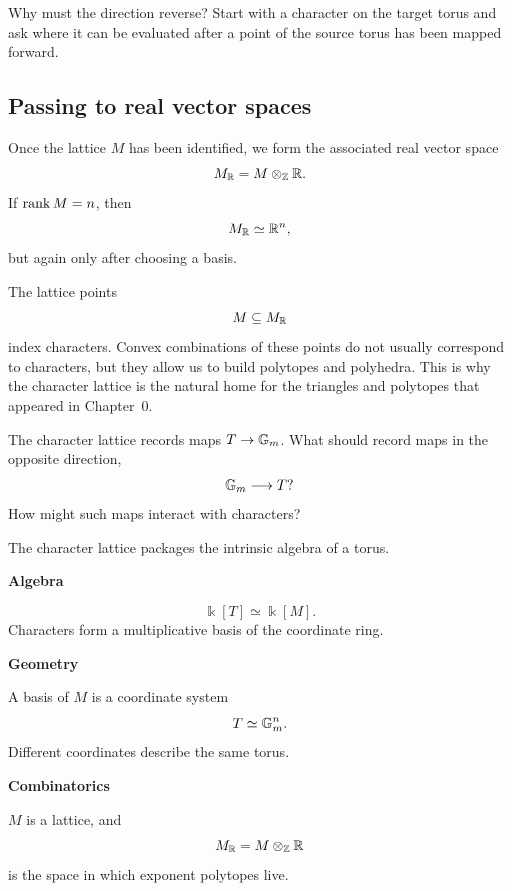 \begin{pauseandthink}
Why must the direction reverse? Start with a character on the target
torus and ask where it can be evaluated after a point of the source
torus has been mapped forward.
\end{pauseandthink}

\subsection{Passing to real vector spaces}

Once the lattice \(M\) has been identified, we form the associated
real vector space
\[
M_{\mathbb{R}}
=
M\otimes_{\mathbb{Z}}\mathbb{R}.
\]
If \(\operatorname{rank} M=n\), then
\[
M_{\mathbb{R}}\simeq\mathbb{R}^n,
\]
but again only after choosing a basis.

The lattice points
\[
M\subseteq M_{\mathbb{R}}
\]
index characters. Convex combinations of these points do not usually
correspond to characters, but they allow us to build polytopes and
polyhedra. This is why the character lattice is the natural home for
the triangles and polytopes that appeared in Chapter~0.

\begin{guidingquestion}
The character lattice records maps \(T\to\mathbb{G}_{m}\). What should record maps
in the opposite direction,
\[
\mathbb{G}_{m}\longrightarrow T?
\]
How might such maps interact with characters?
\end{guidingquestion}

\begin{threedictionaries}
The character lattice packages the intrinsic algebra of a torus.

\medskip

\noindent
\begin{minipage}[t]{0.30\linewidth}
\centering
\textbf{Algebra}\par
\smallskip
\[
\Bbbk[T]\simeq\Bbbk[M].
\]
Characters form a multiplicative basis of the coordinate ring.
\end{minipage}
\hfill
\begin{minipage}[t]{0.30\linewidth}
\centering
\textbf{Geometry}\par
\smallskip
A basis of \(M\) is a coordinate system
\[
T\simeq\mathbb{G}_{m}^n.
\]
Different coordinates describe the same torus.
\end{minipage}
\hfill
\begin{minipage}[t]{0.30\linewidth}
\centering
\textbf{Combinatorics}\par
\smallskip
\(M\) is a lattice, and
\[
M_{\mathbb{R}}=M\otimes_{\mathbb{Z}}\mathbb{R}
\]
is the space in which exponent polytopes live.
\end{minipage}
\end{threedictionaries}



